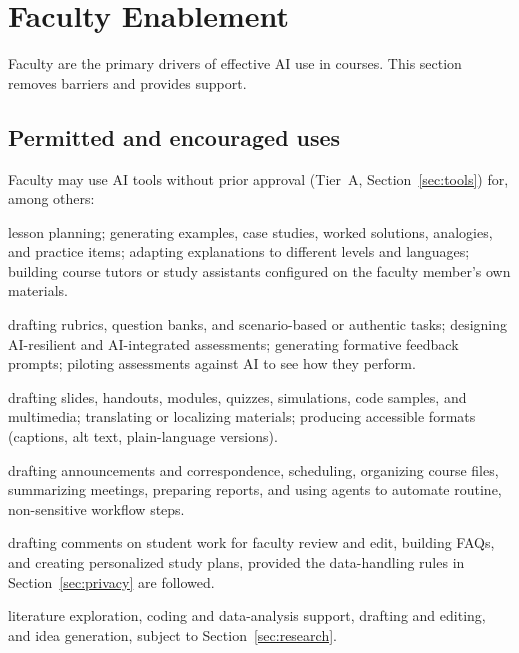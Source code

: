 \section{Faculty Enablement}\label{sec:faculty}

Faculty are the primary drivers of effective AI use in courses. This section removes barriers and provides support.

\subsection{Permitted and encouraged uses}
Faculty may use AI tools without prior approval (Tier~A, Section~\ref{sec:tools}) for, among others:
\begin{description}[leftmargin=0.5cm]
  \item[Teaching and instruction] lesson planning; generating examples, case studies, worked solutions, analogies, and practice items; adapting explanations to different levels and languages; building course tutors or study assistants configured on the faculty member's own materials.
  \item[Assessment design] drafting rubrics, question banks, and scenario-based or authentic tasks; designing AI-resilient and AI-integrated assessments; generating formative feedback prompts; piloting assessments against AI to see how they perform.
  \item[Content creation] drafting slides, handouts, modules, quizzes, simulations, code samples, and multimedia; translating or localizing materials; producing accessible formats (captions, alt text, plain-language versions).
  \item[Course management and administration] drafting announcements and correspondence, scheduling, organizing course files, summarizing meetings, preparing reports, and using agents to automate routine, non-sensitive workflow steps.
  \item[Feedback and student support] drafting comments on student work for faculty review and edit, building FAQs, and creating personalized study plans, provided the data-handling rules in Section~\ref{sec:privacy} are followed.
  \item[Research] literature exploration, coding and data-analysis support, drafting and editing, and idea generation, subject to Section~\ref{sec:research}.
\end{description}

